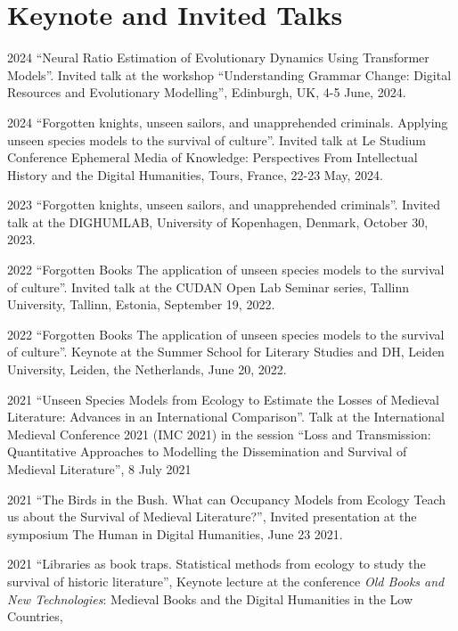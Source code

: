 \documentclass[12pt,letterpaper]{report}
\begin{document}
\section*{Keynote and Invited Talks}
\begin{tablist}
\item[2024] \tab{}``Neural Ratio Estimation of Evolutionary Dynamics Using
  Transformer Models''. Invited talk at the workshop ``Understanding Grammar
  Change: Digital Resources and Evolutionary Modelling'', Edinburgh, UK, 4-5
  June, 2024. 
\item[2024] \tab{}``Forgotten knights, unseen sailors, and unapprehended
  criminals. Applying unseen species models to the survival of culture''.
  Invited talk at Le Studium Conference Ephemeral Media of Knowledge:
  Perspectives From Intellectual History and the Digital Humanities, Tours,
  France, 22-23 May, 2024.
\item[2023] \tab{}``Forgotten knights, unseen sailors, and unapprehended
  criminals''. Invited talk at the DIGHUMLAB, University of Kopenhagen, Denmark,
  October 30, 2023.
\item[2022] \tab{}``Forgotten Books The application of unseen species models to the
  survival of culture''. Invited talk at the CUDAN Open Lab Seminar series, Tallinn
  University, Tallinn, Estonia, September 19, 2022.
\item[2022] \tab{}``Forgotten Books The application of unseen species models to the
  survival of culture''. Keynote at the Summer School for Literary Studies and DH, Leiden
  University, Leiden, the Netherlands, June 20, 2022.
\item[2021] \tab{}``Unseen Species Models from Ecology to Estimate the Losses of Medieval
  Literature: Advances in an International Comparison''. Talk at the International
  Medieval Conference 2021 (IMC 2021) in the session “Loss and Transmission: Quantitative
  Approaches to Modelling the Dissemination and Survival of Medieval Literature”, 8 July
  2021
\item[2021] \tab{}``The Birds in the Bush. What can Occupancy Models from Ecology Teach us
  about the Survival of Medieval Literature?'', Invited presentation at the symposium The
  Human in Digital Humanities, June 23 2021. 
\item[2021] \tab{}``Libraries as book traps. Statistical methods from ecology to study the
  survival of historic literature'', Keynote lecture at the conference \textit{Old Books
    and New Technologies}: Medieval Books and the Digital Humanities in the Low Countries,

\end{tablist}
\end{document}
